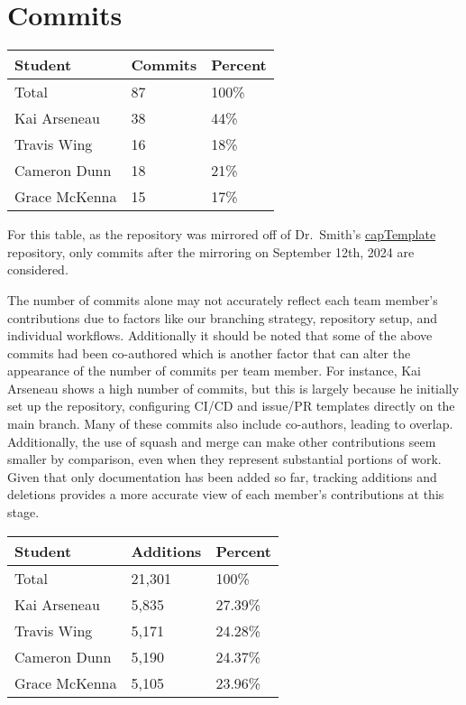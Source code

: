 \documentclass{article}
\begin{document}
\section{Commits}



\begin{table}[H]
\centering
\begin{tabular}{lll}
\toprule
\textbf{Student} & \textbf{Commits} & \textbf{Percent}\\
\midrule
Total & 87 & 100\% \\
Kai Arseneau & 38 & 44\% \\
Travis Wing & 16 & 18\% \\
Cameron Dunn & 18 & 21\% \\
Grace McKenna & 15 & 17\% \\
\bottomrule
\end{tabular}
\end{table}

For this table, as the repository was mirrored off of Dr.~Smith's \href{https://github.com/smiths/capTemplate}{capTemplate} repository, only commits after the mirroring on September 12th, 2024 are considered.

The number of commits alone may not accurately reflect each team member’s contributions due to factors like our branching strategy, repository setup, and individual workflows. Additionally it should be noted that some of the above commits had been co-authored which is another factor that can alter the appearance of the number of commits per team member. For instance, Kai Arseneau shows a high number of commits, but this is largely because he initially set up the repository, configuring CI/CD and issue/PR templates directly on the main branch. Many of these commits also include co-authors, leading to overlap. Additionally, the use of squash and merge can make other contributions seem smaller by comparison, even when they represent substantial portions of work. Given that only documentation has been added so far, tracking additions and deletions provides a more accurate view of each member's contributions at this stage.
\begin{table}[H]
  \centering
  \begin{tabular}{lll}
  \toprule
  \textbf{Student} & \textbf{Additions} & \textbf{Percent}\\
  \midrule
  Total & 21,301 & 100\% \\
  Kai Arseneau & 5,835 & 27.39\% \\
  Travis Wing & 5,171 & 24.28\% \\
  Cameron Dunn & 5,190 & 24.37\% \\
  Grace McKenna & 5,105 & 23.96\% \\
  \bottomrule
  \end{tabular}
\end{table}
\end{document}

